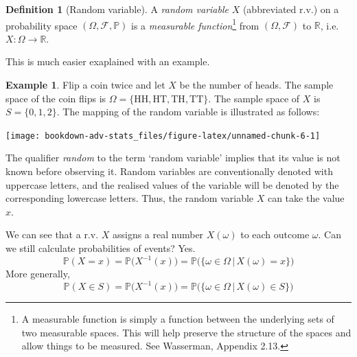 \documentclass[
]{book}
\newcommand{\bbR}{\mathbb{R}}
\newcommand{\bbP}{\mathbb{P}}
\newcommand{\cF}{{\mathcal F}}
\theoremstyle{definition}
\newtheorem{definition}{Definition}[chapter]
\theoremstyle{definition}
\newtheorem{example}{Example}[chapter]
\theoremstyle{definition}
\theoremstyle{definition}
\theoremstyle{remark}
\begin{document}
\begin{definition}[Random variable]
A \emph{random variable} \(X\) (abbreviated r.v.) on a probability space \((\Omega,\cF,\bbP)\) is a \emph{measurable function}\footnote{A measurable function is simply a function between the underlying sets of two measurable spaces. This will help preserve the structure of the spaces and allow things to be measured. See Wasserman, Appendix 2.13.} from \((\Omega,\cF)\) to \(\bbR\), i.e.~\(X:\Omega\to\bbR\).
\end{definition}

This is much easier exaplained with an example.

\begin{example}

Flip a coin twice and let \(X\) be the number of heads.
The sample space of the coin flips is \(\Omega = \{\text{HH}, \text{HT}, \text{TH}, \text{TT} \}\).
The sample space of \(X\) is \(S = \{0,1,2 \}\).
The mapping of the random variable is illustrated as follows:

\begin{center}\texttt{[image: bookdown-adv-stats\_files/figure-latex/unnamed-chunk-6-1]} \end{center}

\end{example}

The qualifier \emph{random} to the term `random variable' implies that its value is not known before observing it.
Random variables are conventionally denoted with uppercase letters, and the realised values of the variable will be denoted by the corresponding lowercase letters. Thus, the random variable \(X\) can take the value \(x\).

We can see that a r.v. \(X\) assigns a real number \(X(\omega)\) to each outcome \(\omega\).
Can we still calculate probabilities of events? Yes.
\[
  \bbP(X=x) = \bbP\big(X^{-1}(x)\big) = \bbP\big(\{ \omega \in \Omega \,|\, X(\omega) = x\} \big)
\]
More generally,
\[
  \bbP(X\in S) = \bbP\big(X^{-1}(x)\big) = \bbP\big(\{ \omega \in \Omega \,|\, X(\omega) \in S \} \big)
\]
\end{document}
